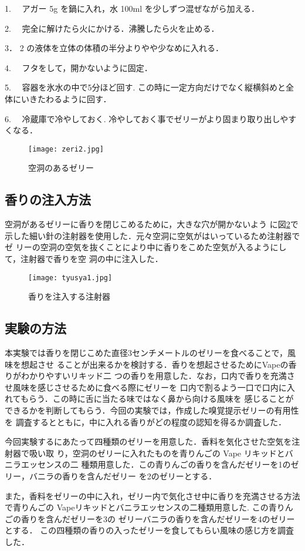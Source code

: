 1. 　アガー 5g を鍋に入れ，水 100ml を少しずつ混ぜながら加える．


2. 　完全に解けたら火にかける．沸騰したら火を止める．


3． 2 の液体を立体の体積の半分よりやや少なめに入れる．


4. 　フタをして，開かないように固定．


5. 　容器を氷水の中で5分ほど回す. この時に一定方向だけでなく縦横斜めと全体にいきたわるように回す．


6. 　冷蔵庫で冷やしておく. 冷やしておく事でゼリーがより固まり取り出しやすくなる．



  \begin{figure}[t]
    \centering
    \texttt{[image: zeri2.jpg]}
    \caption{空洞のあるゼリー}
    \label{zeri}
  \end{figure}


\subsection{香りの注入方法}
  空洞があるゼリーに香りを閉じこめるために，大きな穴が開かないよう
に図\ref{tyusya}で示した細い針の注射器を使用した．元々空洞に空気がはいっているため注射器でゼ
リーの空洞の空気を抜くことにより中に香りをこめた空気が入るようにして，注射器で香りを空
洞の中に注入した．

\begin{figure}[t]
  \centering
  \texttt{[image: tyusya1.jpg]}
  \caption{香りを注入する注射器}
  \label{tyusya}
\end{figure}


\subsection{実験の方法}

本実験では香りを閉じこめた直径3センチメートルのゼリーを食べることで，風味を想起させ
ることが出来るかを検討する．香りを想起させるためにVapeの香りがわかりやすいリキッド二
つの香りを用意した．なお，口内で香りを充満させ風味を感じさせるために食べる際にゼリーを
口内で割るよう一口で口内に入れてもらう．この時に舌に当たる味ではなく鼻から向ける風味を
感じることができるかを判断してもらう．今回の実験では，作成した嗅覚提示ゼリーの有用性を
調査するとともに，中に入れる香りがどの程度の認知を得るか調査した．


今回実験するにあたって四種類のゼリーを用意した．香料を気化させた空気を注射器で吸い取
り，空洞のゼリーに入れたものを青りんごの Vape リキッドとバニラエッセンスの二
種類用意した．この青りんごの香りを含んだゼリーを1のゼリー，バニラの香りを含んだゼリー
を2のゼリーとする．


また，香料をゼリーの中に入れ，ゼリー内で気化させ中に香りを充満させる方法で青りんごの
Vapeリキッドとバニラエッセンスの二種類用意した. この青りんごの香りを含んだゼリーを3の
ゼリーバニラの香りを含んだゼリーを4のゼリーとする．
この四種類の香りの入ったゼリーを食してもらい風味の感じ方を調査した．